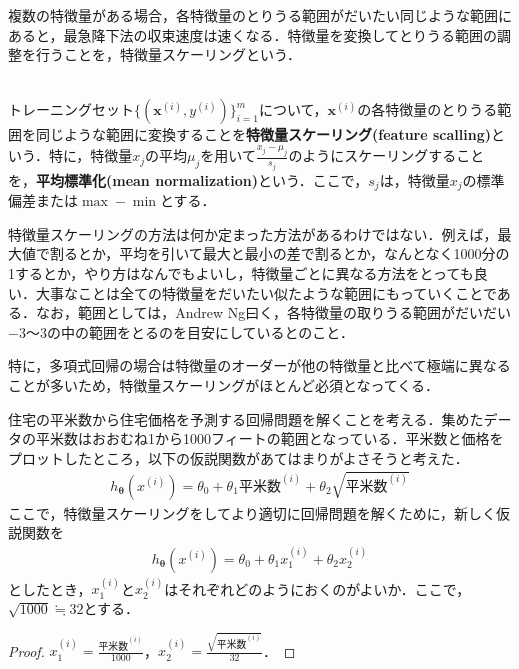 複数の特徴量がある場合，各特徴量のとりうる範囲がだいたい同じような範囲にあると，最急降下法の収束速度は速くなる．特徴量を変換してとりうる範囲の調整を行うことを，特徴量スケーリングという．

\begin{defi}[特徴量スケーリング]
　\\
トレーニングセット$\{({\bm x}^{(i)},y^{(i)})\}_{i=1}^m$について，${\bm x}^{(i)}$の各特徴量のとりうる範囲を同じような範囲に変換することを{\bf 特徴量スケーリング(feature scalling)}という．特に，特徴量$x_j$の平均$\mu_j$を用いて$\frac{x_j-\mu_j}{s_j}$のようにスケーリングすることを，{\bf 平均標準化(mean normalization)}という．ここで，$s_j$は，特徴量$x_j$の標準偏差または$\max - \min$とする．
\end{defi}
\begin{rem}
特徴量スケーリングの方法は何か定まった方法があるわけではない．例えば，最大値で割るとか，平均を引いて最大と最小の差で割るとか，なんとなく1000分の1するとか，やり方はなんでもよいし，特徴量ごとに異なる方法をとっても良い．大事なことは全ての特徴量をだいたい似たような範囲にもっていくことである．なお，範囲としては，Andrew Ng曰く，各特徴量の取りうる範囲がだいだい$-3〜3$の中の範囲をとるのを目安にしているとのこと．
\end{rem}

特に，多項式回帰の場合は特徴量のオーダーが他の特徴量と比べて極端に異なることが多いため，特徴量スケーリングがほとんど必須となってくる．

\begin{qu}
住宅の平米数から住宅価格を予測する回帰問題を解くことを考える．集めたデータの平米数はおおむね1から1000フィートの範囲となっている．平米数と価格をプロットしたところ，以下の仮説関数があてはまりがよさそうと考えた．
\begin{align*}
h_{{\bm \theta}}(x^{(i)})=\theta_0+\theta_1 平米数^{(i)}+\theta_2 \sqrt{平米数^{(i)}}
\end{align*}
ここで，特徴量スケーリングをしてより適切に回帰問題を解くために，新しく仮説関数を
\begin{align*}
h_{{\bm \theta}}(x^{(i)})=\theta_0+\theta_1 x_1^{(i)}+\theta_2 x_2^{(i)}
\end{align*}
としたとき，$x_1^{(i)}$と$x_2^{(i)}$はそれぞれどのようにおくのがよいか．ここで，$\sqrt{1000}\fallingdotseq 32$とする．
\end{qu}
\begin{proof}
$x_1^{(i)}=\frac{平米数^{(i)}}{1000}$，$x_2^{(i)}=\frac{\sqrt{平米数^{(i)}}}{32}$．
\end{proof}

